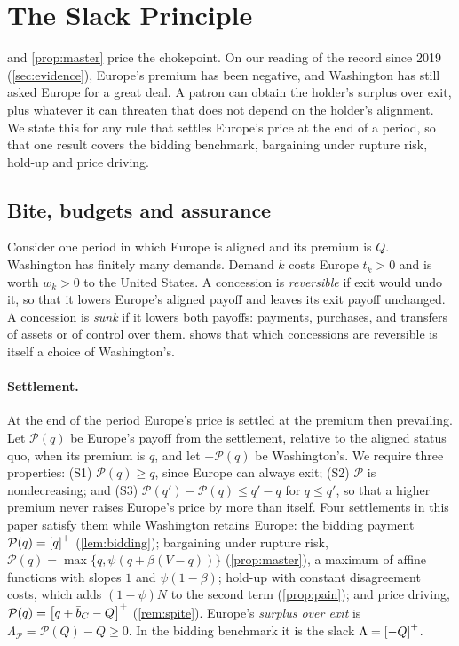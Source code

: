 \section{The Slack Principle}\label{sec:slack}

 and \cref{prop:master} price the chokepoint. On our reading of the record since 2019 (\cref{sec:evidence}), Europe's premium has been negative, and Washington has still asked Europe for a great deal. A patron can obtain the holder's surplus over exit, plus whatever it can threaten that does not depend on the holder's alignment. We state this for any rule that settles Europe's price at the end of a period, so that one result covers the bidding benchmark, bargaining under rupture risk, hold-up and price driving.

\subsection{Bite, budgets and assurance}\label{sec:slackprinciple}

Consider one period in which Europe is aligned and its premium is $Q$. Washington has finitely many demands. Demand $k$ costs Europe $t_k>0$ and is worth $w_k>0$ to the United States. A concession is \emph{reversible} if exit would undo it, so that it lowers Europe's aligned payoff and leaves its exit payoff unchanged. A concession is \emph{sunk} if it lowers both payoffs: payments, purchases, and transfers of assets or of control over them.  shows that which concessions are reversible is itself a choice of Washington's.

\paragraph{Settlement.} At the end of the period Europe's price is settled at the premium then prevailing. Let $\mathcal P(q)$ be Europe's payoff from the settlement, relative to the aligned status quo, when its premium is $q$, and let $-\mathcal P(q)$ be Washington's. We require three properties: (S1) $\mathcal P(q)\ge q$, since Europe can always exit; (S2) $\mathcal P$ is nondecreasing; and (S3) $\mathcal P(q')-\mathcal P(q)\le q'-q$ for $q\le q'$, so that a higher premium never raises Europe's price by more than itself. Four settlements in this paper satisfy them while Washington retains Europe: the bidding payment $\mathcal P(q)=\left[q\right]^{+}$ (\cref{lem:bidding}); bargaining under rupture risk, $\mathcal P(q)=\max\{q,\psi(q+\beta(V-q))\}$ (\cref{prop:master}), a maximum of affine functions with slopes $1$ and $\psi(1-\beta)$; hold-up with constant disagreement costs, which adds $(1-\psi)N$ to the second term (\cref{prop:pain}); and price driving, $\mathcal P(q)=\left[q+\bar b_C-Q\right]^{+}$ (\cref{rem:spite}). Europe's \emph{surplus over exit} is $\Lambda_{\mathcal P}=\mathcal P(Q)-Q\ge 0$. In the bidding benchmark it is the slack $\Lambda=\left[-Q\right]^{+}$.

